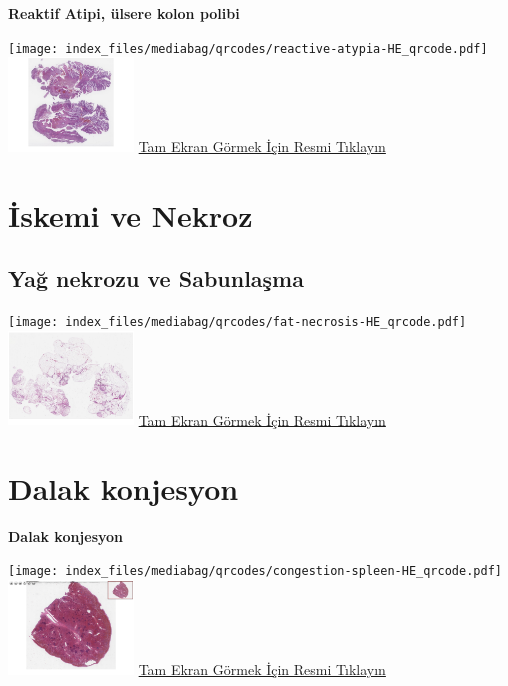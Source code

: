 \documentclass[
  letterpaper,
  DIV=11,
  numbers=noendperiod]{scrreprt}
\begin{document}
\textbf{Reaktif Atipi, ülsere kolon polibi}

\texttt{[image: index\_files/mediabag/qrcodes/reactive-atypia-HE\_qrcode.pdf]}
\href{https://images.patolojiatlasi.com/reactive-atypia/HE.html}{\includegraphics[width=0.25\textwidth,height=\textheight]{./screenshots/thumbnail_reactive-atypia.png}}
\href{https://images.patolojiatlasi.com/reactive-atypia/HE.html}{Tam
Ekran Görmek İçin Resmi Tıklayın}

\chapter{İskemi ve Nekroz}\label{sec-iskemi-ve-nekroz}

\section{Yağ nekrozu ve Sabunlaşma}\label{sec-yag-nekrozu-sabunlasma}

\texttt{[image: index\_files/mediabag/qrcodes/fat-necrosis-HE\_qrcode.pdf]}
\href{https://images.patolojiatlasi.com/fat-necrosis/HE.html}{\includegraphics[width=0.25\textwidth,height=\textheight]{./screenshots/thumbnail_fat-necrosis.png}}
\href{https://images.patolojiatlasi.com/fat-necrosis/HE.html}{Tam Ekran
Görmek İçin Resmi Tıklayın}

\chapter{Dalak konjesyon}\label{sec-congestion-spleen}

\textbf{Dalak konjesyon}

\texttt{[image: index\_files/mediabag/qrcodes/congestion-spleen-HE\_qrcode.pdf]}
\href{https://images.patolojiatlasi.com/congestion-spleen/HE.html}{\includegraphics[width=0.25\textwidth,height=\textheight]{./screenshots/thumbnail_congestion-spleen.png}}
\href{https://images.patolojiatlasi.com/congestion-spleen/HE.html}{Tam
Ekran Görmek İçin Resmi Tıklayın}
\end{document}
